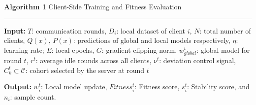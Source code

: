 \documentclass[pdflatex,sn-mathphys-num,oneside]{sn-jnl}%
\theoremstyle{thmstyleone}%
\theoremstyle{thmstyletwo}%
\theoremstyle{thmstylethree}%
\begin{document}
\vspace{5mm}
    
\begingroup
\small
\setlength{\tabcolsep}{3pt}
\renewcommand{\arraystretch}{0.92}

\noindent\textbf{Algorithm 1} Client-Side Training and Fitness Evaluation
\par\noindent\rule{\linewidth}{0.4pt}
\vspace{1mm}

\noindent\textbf{Input:} $T$: communication rounds, $D_i$: local dataset of client $i$, $N$: total number of
clients, $Q(x)$, $P(x)$: predictions of global and local models respectively, $\eta$:
learning rate; $E$: local epochs, $G$: gradient-clipping norm, $w^t_{global}$: global model for round $t$, $\overline{r^t}$: average idle
rounds across all clients, $\nu^{t}$: deviation control signal, $C^t_k \subset \mathcal{C}$: cohort selected by the server at round $t$

\vspace{1mm}

\noindent\textbf{Output:} $w^t_i$: Local model update, $Fitness^t_i$: Fitness score, $s^t_i$: Stability score, and $n_i$: sample count.

\vspace{1mm}
\end{document}
